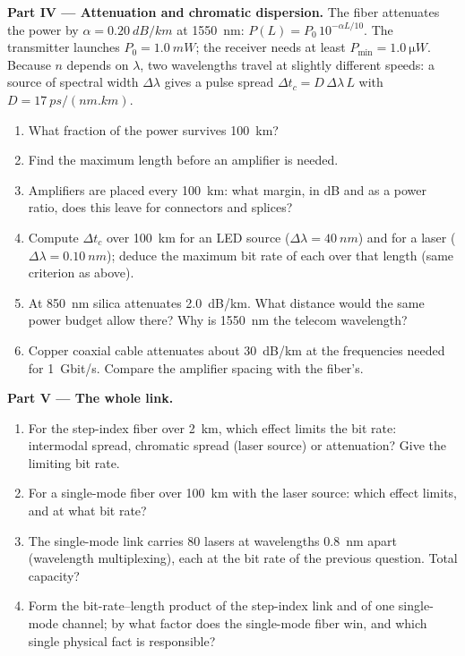 \begin{problem}
\medskip
\noindent\textbf{Part IV --- Attenuation and chromatic dispersion.}
The fiber attenuates the power by $\alpha = \qty{0.20}{dB/km}$ at
\qty{1550}{nm}: $P(L) = P_0\,10^{-\alpha L/10}$. The transmitter
launches $P_0 = \qty{1.0}{mW}$; the receiver needs at least
$P_{\min} = \qty{1.0}{\micro W}$. Because $n$ depends on $\lambda$, two
wavelengths travel at slightly different speeds: a source of spectral
width $\Delta\lambda$ gives a pulse spread $\Delta t_c = D\,\Delta\lambda\,L$
with $D = \qty{17}{ps/(nm.km)}$.
\begin{enumerate}[resume]
  \item What fraction of the power survives \qty{100}{km}?
  \item Find the maximum length before an amplifier is needed.
  \item Amplifiers are placed every \qty{100}{km}: what margin, in dB
        and as a power ratio, does this leave for connectors and
        splices?
  \item Compute $\Delta t_c$ over \qty{100}{km} for an LED source
        ($\Delta\lambda = \qty{40}{nm}$) and for a laser
        ($\Delta\lambda = \qty{0.10}{nm}$); deduce the maximum bit rate
        of each over that length (same criterion as above).
  \item At \qty{850}{nm} silica attenuates \qty{2.0}{dB/km}. What
        distance would the same power budget allow there? Why is
        \qty{1550}{nm} the telecom wavelength?
  \item Copper coaxial cable attenuates about \qty{30}{dB/km} at the
        frequencies needed for \qty{1}{Gbit/s}. Compare the amplifier
        spacing with the fiber's.
\end{enumerate}

\medskip
\noindent\textbf{Part V --- The whole link.}
\begin{enumerate}[resume]
  \item For the step-index fiber over \qty{2}{km}, which effect limits
        the bit rate: intermodal spread, chromatic spread (laser source)
        or attenuation? Give the limiting bit rate.
  \item For a single-mode fiber over \qty{100}{km} with the laser
        source: which effect limits, and at what bit rate?
  \item The single-mode link carries $80$ lasers at wavelengths
        \qty{0.8}{nm} apart (wavelength multiplexing), each at the bit
        rate of the previous question. Total capacity?
  \item Form the bit-rate--length product of the step-index link and of
        one single-mode channel; by what factor does the single-mode
        fiber win, and which single physical fact is responsible?
\end{enumerate}
\end{problem}
